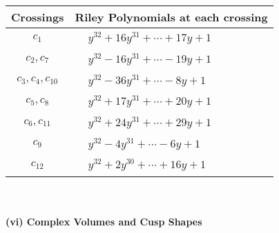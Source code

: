 \documentclass[1p]{elsarticle_modified}
\theoremstyle{definition}
\begin{document}
\begin{tabular}{m{50pt}|m{274pt}}
Crossings & \hspace{64pt}Riley Polynomials at each crossing \\
\hline $$\begin{aligned}c_{1}\end{aligned}$$&$\begin{aligned}
&y^{32}+16 y^{31}+\cdots+17 y+1
\end{aligned}$\\
\hline $$\begin{aligned}c_{2},c_{7}\end{aligned}$$&$\begin{aligned}
&y^{32}-16 y^{31}+\cdots-19 y+1
\end{aligned}$\\
\hline $$\begin{aligned}c_{3},c_{4},c_{10}\end{aligned}$$&$\begin{aligned}
&y^{32}-36 y^{31}+\cdots-8 y+1
\end{aligned}$\\
\hline $$\begin{aligned}c_{5},c_{8}\end{aligned}$$&$\begin{aligned}
&y^{32}+17 y^{31}+\cdots+20 y+1
\end{aligned}$\\
\hline $$\begin{aligned}c_{6},c_{11}\end{aligned}$$&$\begin{aligned}
&y^{32}+24 y^{31}+\cdots+29 y+1
\end{aligned}$\\
\hline $$\begin{aligned}c_{9}\end{aligned}$$&$\begin{aligned}
&y^{32}-4 y^{31}+\cdots-6 y+1
\end{aligned}$\\
\hline $$\begin{aligned}c_{12}\end{aligned}$$&$\begin{aligned}
&y^{32}+2 y^{30}+\cdots+16 y+1
\end{aligned}$\\
\hline
\end{tabular}\\~\\
\newpage\flushleft \textbf{(vi) Complex Volumes and Cusp Shapes}
\end{document}
